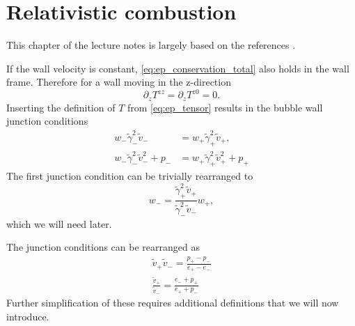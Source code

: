 \section{Relativistic combustion}
This chapter of the lecture notes is largely based on the references
\cites{hindmarsh_gw_pt_2019}{espinosa_energy_2010}.

If the wall velocity is constant, \eqref{eq:ep_conservation_total} also holds in the wall frame.
Therefore for a wall moving in the z-direction
\cite[eq. 7]{espinosa_energy_2010}
\begin{equation}
\partial_z T^{zz} = \partial_z T^{z0} = 0.
\end{equation}
Inserting the definition of $T$ from \eqref{eq:ep_tensor} results in the bubble wall junction conditions
\cites[eq. 7.22]{lecture_notes}[eq. 135.2, 135.3]{landau_fluid_1987}
\begin{align}
w_- \tilde{\gamma}_-^2 \tilde{v}_- &= w_+ \tilde{\gamma}_+^2 \tilde{v}_+,
\label{eq:junction_condition_1} \\
w_- \tilde{\gamma}_-^2 \tilde{v}_-^2 + p_- &= w_+ \tilde{\gamma}_+^2 \tilde{v}_+^2 + p_+
\label{eq:junction_condition_2}
\end{align}
The first junction condition can be trivially rearranged to
\begin{equation}
w_- = \frac{\tilde{\gamma}_+^2 \tilde{v}_+}{\tilde{\gamma}_-^2 \tilde{v}_-} w_+,
\label{eq:wm_junction}
\end{equation}
which we will need later.

The junction conditions can be rearranged as
\cites[eq. 7.32]{lecture_notes}[eq. 4.134]{rezzolla_relativistic_2013}
\begin{align}
\tilde{v}_+ \tilde{v}_- = \frac{p_+ - p_-}{e_+ - e_-} \\
\frac{\tilde{v}_+}{\tilde{v}_-} = \frac{e_- + p_+}{e_+ + p_-}
\label{eq:junction_ep}
\end{align}
Further simplification of these requires additional definitions
that we will now introduce.


